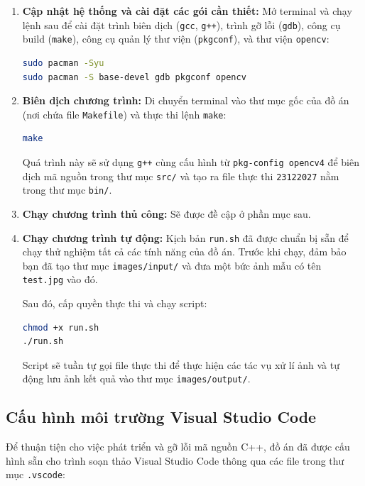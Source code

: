 \begin{enumerate}
    \item \textbf{Cập nhật hệ thống và cài đặt các gói cần thiết:}
    Mở terminal và chạy lệnh sau để cài đặt trình biên dịch (\texttt{gcc}, \texttt{g++}), trình gỡ lỗi (\texttt{gdb}), công cụ build (\texttt{make}), công cụ quản lý thư viện (\texttt{pkgconf}), và thư viện \texttt{opencv}:
    \begin{lstlisting}[language=bash, frame=single]
sudo pacman -Syu
sudo pacman -S base-devel gdb pkgconf opencv
    \end{lstlisting}

    \item \textbf{Biên dịch chương trình:}
    Di chuyển terminal vào thư mục gốc của đồ án (nơi chứa file \texttt{Makefile}) và thực thi lệnh \texttt{make}:
    \begin{lstlisting}[language=bash, frame=single]
make
    \end{lstlisting}
    Quá trình này sẽ sử dụng \texttt{g++} cùng cấu hình từ \texttt{pkg-config opencv4} để biên dịch mã nguồn trong thư mục \texttt{src/} và tạo ra file thực thi \texttt{23122027} nằm trong thư mục \texttt{bin/}.
    \item \textbf{Chạy chương trình thủ công:} Sẽ được đề cập ở phần mục sau.
    \item \textbf{Chạy chương trình tự động:}
    Kịch bản \texttt{run.sh} đã được chuẩn bị sẵn để chạy thử nghiệm tất cả các tính năng của đồ án. Trước khi chạy, đảm bảo bạn đã tạo thư mục \texttt{images/input/} và đưa một bức ảnh mẫu có tên \texttt{test.jpg} vào đó.
    
    Sau đó, cấp quyền thực thi và chạy script:
    \begin{lstlisting}[language=bash, frame=single]
chmod +x run.sh
./run.sh
    \end{lstlisting}
    Script sẽ tuần tự gọi file thực thi để thực hiện các tác vụ xử lí ảnh và tự động lưu ảnh kết quả vào thư mục \texttt{images/output/}.
\end{enumerate}

\subsection{Cấu hình môi trường Visual Studio Code}
Để thuận tiện cho việc phát triển và gỡ lỗi mã nguồn C++, đồ án đã được cấu hình sẵn cho trình soạn thảo Visual Studio Code thông qua các file trong thư mục \texttt{.vscode}:

